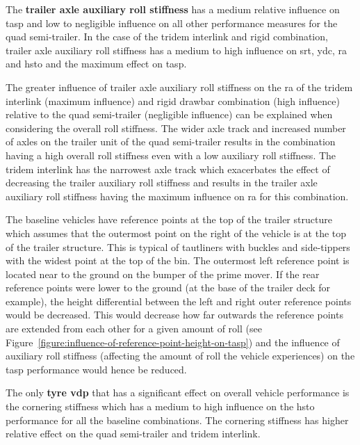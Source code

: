 The \textbf{trailer axle auxiliary roll stiffness} has a medium relative influence on \gls{tasp} and low to negligible influence on all other performance measures for the quad semi-trailer. In the case of the tridem interlink and rigid combination, trailer axle auxiliary roll stiffness has a medium to high influence on \gls{srt}, \gls{ydc}, \gls{ra} and \gls{hsto} and the maximum effect on \gls{tasp}.

The greater influence of trailer axle auxiliary roll stiffness on the \gls{ra} of the tridem interlink (maximum influence) and rigid drawbar combination (high influence) relative to the quad semi-trailer (negligible influence) can be explained when considering the overall roll stiffness. The wider axle track and increased number of axles on the trailer unit of the quad semi-trailer results in the combination having a high overall roll stiffness even with a low auxiliary roll stiffness. The tridem interlink has the narrowest axle track which exacerbates the effect of decreasing the trailer auxiliary roll stiffness and results in the trailer axle auxiliary roll stiffness having the maximum influence on \gls{ra} for this combination.

The baseline vehicles have reference points at the top of the trailer structure which assumes that the outermost point on the right of the vehicle is at the top of the trailer structure. This is typical of tautliners with buckles and side-tippers with the widest point at the top of the bin. The outermost left reference point is located near to the ground on the bumper of the prime mover. If the rear reference points were lower to the ground (at the base of the trailer deck for example), the height differential between the left and right outer reference points would be decreased. This would decrease how far outwards the reference points are extended from each other for a given amount of roll (see Figure~\ref{figure:influence-of-reference-point-height-on-tasp}) and the influence of auxiliary roll stiffness (affecting the amount of roll the vehicle experiences) on the \gls{tasp} performance would hence be reduced.

The only \textbf{tyre \gls{vdp}} that has a significant effect on overall vehicle performance is the cornering stiffness which has a medium to high influence on the \gls{hsto} performance for all the baseline combinations. The cornering stiffness has higher relative effect on the quad semi-trailer and tridem interlink.

